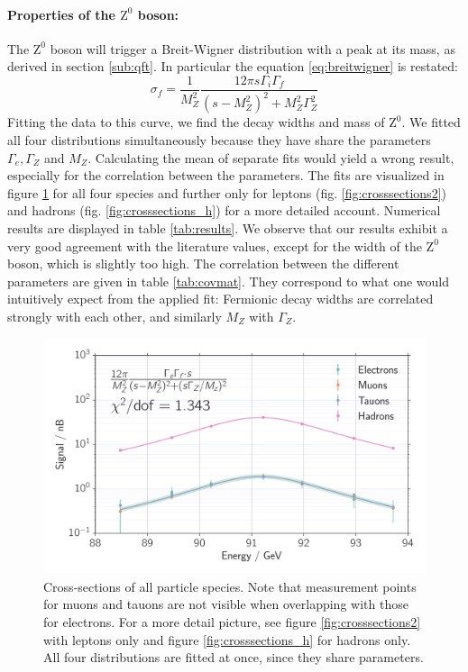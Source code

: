 \paragraph{\textbf{Properties of the $\mathrm{Z^0}$ boson:}}
\label{par:Z0}
The $\mathrm{Z^0}$ boson will trigger a Breit-Wigner distribution
with a peak at its mass, as derived in section \ref{sub:qft}. In particular the equation 
\eqref{eq:breitwigner} is restated:
\begin{equation*}
    \sigma_f = \frac{1}{M_Z^2} \frac{12\pi s \Gamma_i \Gamma_f }{(s- M_Z^2)^2 + M_Z^2 \Gamma_Z^2}
\end{equation*}
Fitting the data to this curve, we find the decay widths and mass of $\mathrm{Z^0}$. 
We fitted all four distributions simultaneously because they have share the parameters $\Gamma_e, \Gamma_Z$ and $M_Z$. 
Calculating the mean of separate fits would yield a wrong result, especially for the correlation between the parameters. 
The fits are visualized in figure \ref{fig:crosssections} for all 
four species and further only for leptons (fig. \ref{fig:crosssections2}) and hadrons (fig. \ref{fig:crosssections_h})
for a more detailed account. Numerical results are displayed in table \ref{tab:results}.
We observe that our results exhibit a very good agreement with the literature
values, except for the width of the $\mathrm{Z^0}$ boson, which is slightly too high. 
The correlation between the different parameters are 
given in table \ref{tab:covmat}. They correspond to what one would intuitively expect from the applied fit: Fermionic decay
widths are correlated strongly with each other, and similarly $M_Z$ with $\Gamma_Z$.

\begin{figure}[htpb]
    \centering
    \includegraphics[width=1.0\linewidth]{figures/crosssections}
    \caption{Cross-sections of all particle species. Note that measurement points for 
        muons and tauons are not visible when overlapping with those for electrons. 
        For a more detail picture, see figure \ref{fig:crosssections2} with leptons only
    and figure \ref{fig:crosssections_h} for hadrons only. 
    All four distributions are fitted at once, since they share parameters. 
    }
    \label{fig:crosssections}
\end{figure}


